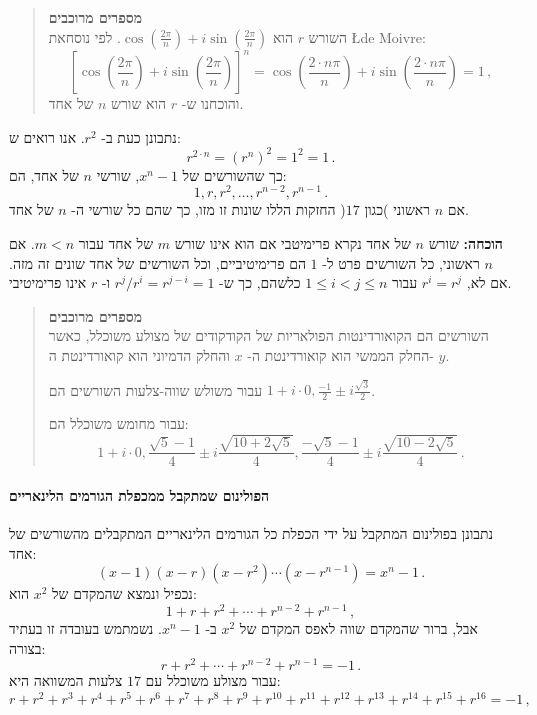 \documentclass[11pt,a4paper]{article}
\newcommand*{\disfrac}[2]{\displaystyle\frac{#1}{#2}}
\begin{document}
\begin{quote}
\textbf{מספרים מרוכבים}\\
השורש
$r$
הוא
$\cos \left(\disfrac{2\pi}{n}\right) + i\sin  \left(\disfrac{2\pi}{n}\right)$.
לפי נוסחאת
\L{de Moivre}:
\[
\left[\cos \left(\disfrac{2\pi}{n}\right) + i\sin  \left(\disfrac{2\pi}{n}\right)\right]^{n}=
\cos \left(\disfrac{2\cdot n\pi}{n}\right) + i\sin  \left(\disfrac{2\cdot n\pi}{n}\right)= 1\,,
\]
והוכחנו ש-%
$r$
הוא שורש
$n$
של אחד.
\end{quote}
נתבונן כעת ב-%
$r^2$.
אנו רואים ש:
\[
r^{2\cdot n}=(r^{n})^2=1^2=1\,.
\]
כך שהשורשים של
 $x^{n}-1$,
 שורשי
 $n$
 של אחד, הם:
\[
1, r, r^2, \ldots, r^{n-2}, r^{n-1}\,.
\]
אם
$n$
ראשוני 
)כגון
$17$(
החזקות הללו שונות זו מזו,
כך שהם כל שורשי ה-%
$n$
של אחד.

\textbf{הוכחה:}
שורש
$n$
של אחד נקרא פרימיטבי אם הוא אינו שורש
$m$
של אחד עבור
$m<n$.
אם
$n$
ראשוני, כל השורשים פרט ל-%
$1$
הם פרימיטיביים, וכל השורשים של אחד שונים זה מזה.
אם לא,
$r^i=r^j$
עבור
$1\leq i<j\leq n$
כלשהם, כך ש-%
$r^j/r^i=r^{j-i}=1$
ו-%
$r$
אינו פרימיטיבי.

\begin{quote}
\textbf{מספרים מרוכבים}\\
השורשים הם הקואורדינטות הפולאריות של הקודקודים של מצולע משוכלל, כאשר החלק הממשי הוא  קואורדינטת ה-%
$x$
והחלק הדמיוני הוא קואורדינטת ה-%
$y$.

עבור משולש שווה-צלעות השורשים הם
$1+i\cdot 0,\disfrac{-1}{2}\pm i\disfrac{\sqrt{3}}{2}$.

עבור מחומש משוכלל הם:
\[
1+i\cdot 0,\frac{\sqrt{5}-1}{4}\pm i \frac{\sqrt{10+2\sqrt{5}}}{4},\frac{-\sqrt{5}-1}{4}\pm i \frac{\sqrt{10-2\sqrt{5}}}{4}\,.
\]
\end{quote}

\paragraph{הפולינום שמתקבל ממכפלת הגורמים הלינאריים}
נתבונן בפולינום המתקבל על ידי הכפלת כל הגורמים הלינאריים המתקבלים מהשורשים של אחד:
\[
(x-1) (x-r)(x-r^2) \cdots (x-r^{n-1})=x^n-1\,.
\]
נכפיל ונמצא שהמקדם של
$x^2$
הוא:
\[
1+r+r^2+\cdots + r^{n-2}+r^{n-1}\,,
\]
אבל, ברור שהמקדם שווה לאפס
המקדם של
$x^2$
ב-%
$x^{n}-1$.
נשמתמש בעובדה זו בעתיד בצורה:
\[
r+r^2+\cdots + r^{n-2}+r^{n-1}=-1\,.
\]
עבור מצולע משוכלל עם 
$17$
צלעות המשוואה היא:
\[
r+r^2+r^3+r^4+r^5+r^6+r^7+r^8+r^9+r^{10}+r^{11}+r^{12}+r^{13}+r^{14} + r^{15}+r^{16}=-1\,,
\]
\end{document}
